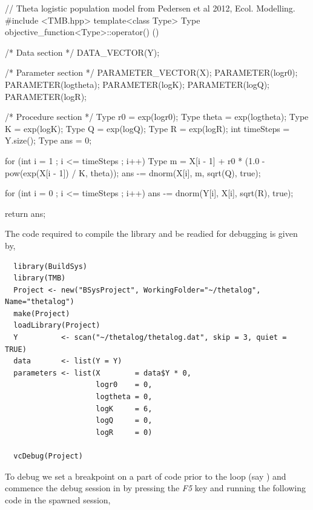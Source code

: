 \begin{Schunk}
  \begin{Sinput}
    // Theta logistic population model from Pedersen et al 2012, Ecol. Modelling.
    #include <TMB.hpp>
    template<class Type>
    Type objective_function<Type>::operator() ()
    {
      /* Data section */
      DATA_VECTOR(Y);

      /* Parameter section */
      PARAMETER_VECTOR(X);
      PARAMETER(logr0);
      PARAMETER(logtheta);
      PARAMETER(logK);
      PARAMETER(logQ);
      PARAMETER(logR);

      /* Procedure section */
      Type r0       = exp(logr0);
      Type theta    = exp(logtheta);
      Type K        = exp(logK);
      Type Q        = exp(logQ);
      Type R        = exp(logR);
      int timeSteps = Y.size();
      Type ans      = 0;

      for (int i = 1 ; i <= timeSteps ; i++)
      {
        Type m = X[i - 1] + r0 * (1.0 - pow(exp(X[i - 1]) / K, theta));
        ans -= dnorm(X[i], m, sqrt(Q), true);
      }

      for (int i = 0 ; i <= timeSteps ; i++)
      {
        ans -= dnorm(Y[i], X[i], sqrt(R), true);
      }

      return ans;
    }
  \end{Sinput}
\end{Schunk}

The  code required to compile the library and be readied for debugging is given by,

\begin{Schunk}
  \begin{verbatim}
  library(BuildSys)
  library(TMB)
  Project <- new("BSysProject", WorkingFolder="~/thetalog", Name="thetalog")
  make(Project)
  loadLibrary(Project)
  Y          <- scan("~/thetalog/thetalog.dat", skip = 3, quiet = TRUE)
  data       <- list(Y = Y)
  parameters <- list(X        = data$Y * 0,
                     logr0    = 0,
                     logtheta = 0,
                     logK     = 6,
                     logQ     = 0,
                     logR     = 0)
    
  vcDebug(Project)
  \end{verbatim}
\end{Schunk}

To debug we set a breakpoint on a part of code prior to the loop (say ) and commence 
the debug session in  by pressing the \emph{F5} key and running the following  code 
in the spawned  session,

